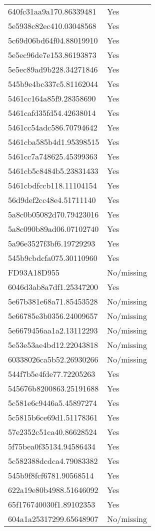 \begin{tabular}{ll}
640fc31aa9a170.86339481 & Yes \\
5e5938c82ec410.03048568 & Yes \\
5c69d06bd64f04.88019910 & Yes \\
5e5ec96de7e153.86193873 & Yes \\
5e5ec89ad9b228.34271846 & Yes \\
545b9e4bc337c5.81162044 & Yes \\
5461cc164a85f9.28358690 & Yes \\
5461cafd35fd54.42638014 & Yes \\
5461cc54adc586.70794642 & Yes \\
5461cba585b4d1.95398515 & Yes \\
5461cc7a748625.45399363 & Yes \\
5461cb5c8484b5.23831433 & Yes \\
5461cbdfccb118.11104154 & Yes \\
56d9def2cc48e4.51711140 & Yes \\
5a8c0b05082d70.79423016 & Yes \\
5a8c090b89ad06.07102740 & Yes \\
5a96e3527f3bf6.19729293 & Yes \\
545b9cbdcfa075.30110960 & Yes \\
FD93A18D955 & No/missing \\
6046d3ab8a7df1.25347200 & Yes \\
5e67b381e68a71.85453528 & No/missing \\
5e66785e3b0356.24009657 & No/missing \\
5e6679456aa1a2.13112293 & No/missing \\
5e53e53ae4bd12.22043818 & No/missing \\
60338026ca5b52.26930266 & No/missing \\
544f7b5e4fde77.72205263 & Yes \\
545676b8200863.25191688 & Yes \\
5c581e6c9446a5.45897274 & Yes \\
5c5815b6ce69d1.51178361 & Yes \\
57e2352c51ca40.86628524 & Yes \\
5f75bea0f35134.94586434 & Yes \\
5c582388dcdca4.79083382 & Yes \\
545b9f8fcf6781.90568514 & Yes \\
622a19e80b4988.51646092 & Yes \\
65f176740030f1.89102353 & Yes \\
604a1a25317299.65648907 & No/missing \\

\end{tabular}
